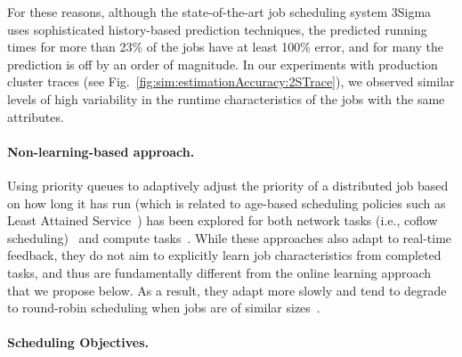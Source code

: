For these reasons, although the state-of-the-art job scheduling system 3Sigma~\cite{3Sigma} 
uses sophisticated history-based prediction techniques,
the predicted running times for more than 23\% of the jobs have at
least 100\% error, and for many the prediction is off by an order of
magnitude. In our experiments with production cluster traces (see
Fig.~\ref{fig:sim:estimationAccuracy:2STrace}), we observed similar
levels of high variability in the runtime characteristics of the jobs with the same
attributes.

\paragraph*{Non-learning-based approach.}
Using priority queues to adaptively adjust the priority of a
distributed job based on how long it has run
(which is related to age-based
scheduling policies such as Least Attained Service~\cite{scully2018soap,raiLAS:sigmetrics2003})
has been explored for both network tasks
(i.e., coflow scheduling)~\cite{aalo:sigcomm2015,graviton:hotcloud16,jajooSaath} and
compute tasks~\cite{kairos:socc2018}.
While these
approaches also adapt to real-time feedback, they do not aim to
explicitly learn job characteristics from completed tasks, and thus are
fundamentally different from the online learning approach that we
propose below.  As a result, they adapt more slowly and tend to
degrade to round-robin scheduling when jobs are of similar
sizes~\cite{jajoo:atc2019}.

 
 





\paragraph*{Scheduling Objectives.}



